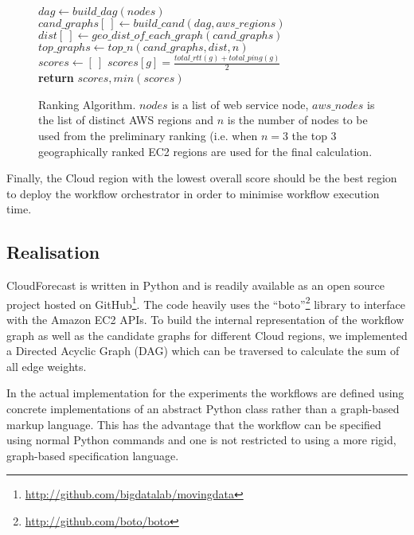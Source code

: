 \documentclass[10pt, conference, compsocconf]{IEEEtran}
\newcommand{\sysname}{CloudForecast\xspace}
\begin{document}
\begin{figure}
  \begin{algorithmic}
      \State $dag\gets build\_dag(nodes)$
      \State $cand\_graphs[~]\gets build\_cand(dag, aws\_regions)$
      \State $dist[~]\gets geo\_dist\_of\_each\_graph(cand\_graphs)$
      \State $top\_graphs\gets top\_n(cand\_graphs, dist, n)$\\

      \State $scores\gets [~]$
        \State $scores[g] = \frac{total\_rtt(g) + total\_ping(g)}{2}$
      \EndFor
      \\
      \State \textbf{return} $scores, min(scores)$
    \EndProcedure
  \end{algorithmic}
\caption{Ranking Algorithm. $nodes$ is a list of web service node, $aws\_nodes$ is the list of distinct AWS regions and $n$ is the number of nodes to be used from the preliminary ranking (i.e. when $n=3$ the top 3 geographically ranked EC2 regions are used for the final calculation.}\label{eq:score}
\end{figure}


Finally, the Cloud region with the lowest overall score should be the best region to deploy the workflow orchestrator in order to minimise workflow execution time.


\subsection{Realisation}






\sysname is written in Python and is readily available as an open source project hosted on GitHub\footnote{\url{http://github.com/bigdatalab/movingdata}}. The code heavily uses the ``boto''\footnote{\url{http://github.com/boto/boto}} library to interface with the Amazon EC2 APIs. To build the internal representation of the workflow graph as well as the candidate graphs for different Cloud regions, we implemented a Directed Acyclic Graph (DAG) which can be traversed to calculate the sum of all edge weights.

In the actual implementation for the experiments the workflows are defined using concrete implementations of an abstract Python class rather than a graph-based markup language. This has the advantage that the workflow can be specified using normal Python commands and one is not restricted to using a more rigid, graph-based specification language.
\end{document}
